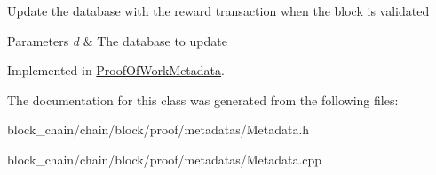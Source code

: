 Update the database with the reward transaction when the block is validated


\begin{DoxyParams}{Parameters}
{\em d} & The database to update \\
\hline
\end{DoxyParams}


Implemented in \mbox{\hyperlink{classProofOfWorkMetadata_add9667954ffeaee75f3329c6c832e8b7}{Proof\+Of\+Work\+Metadata}}.



The documentation for this class was generated from the following files\+:\begin{DoxyCompactItemize}
\item 
block\+\_\+chain/chain/block/proof/metadatas/Metadata.\+h\item 
block\+\_\+chain/chain/block/proof/metadatas/Metadata.\+cpp\end{DoxyCompactItemize}
